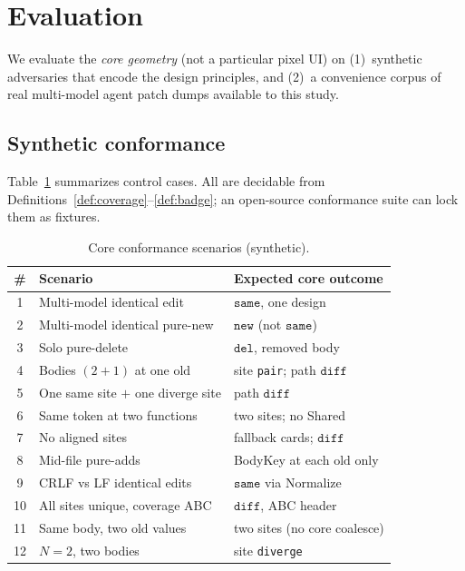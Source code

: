 \documentclass[
  11pt,
  a4paper,
  oneside,
  numbers=noenddot,
  abstract=true,
  headings=normal,
  DIV=11,
  BCOR=0mm,
]{scrartcl}
\theoremstyle{definition}
\theoremstyle{plain}
\theoremstyle{remark}
\newcommand{\badge}[1]{\texttt{#1}}
\begin{document}
\section{Evaluation}
\label{sec:eval}

We evaluate the \emph{core geometry} (not a particular pixel UI) on
(1)~synthetic adversaries that encode the design principles, and
(2)~a convenience corpus of real multi-model agent patch dumps available
to this study.

\subsection{Synthetic conformance}

Table~\ref{tab:conform} summarizes control cases. All are decidable from
Definitions~\ref{def:coverage}--\ref{def:badge}; an open-source conformance
suite can lock them as fixtures.

\begin{table}[t]
\centering
\caption{Core conformance scenarios (synthetic).}
\label{tab:conform}
\begin{tabular}{@{}clp{6.2cm}@{}}
\toprule
\# & Scenario & Expected core outcome \\
\midrule
1 & Multi-model identical edit & $\badge{same}$, one design \\
2 & Multi-model identical pure-new & $\badge{new}$ (not $\badge{same}$) \\
3 & Solo pure-delete & $\badge{del}$, removed body \\
4 & Bodies $(2{+}1)$ at one $\mathrm{old}$ & site \texttt{pair}; path $\badge{diff}$ \\
5 & One same site $+$ one diverge site & path $\badge{diff}$ \\
6 & Same token at two functions & two sites; no Shared \\
7 & No aligned sites & fallback cards; $\badge{diff}$ \\
8 & Mid-file pure-adds & BodyKey at each $\mathrm{old}$ only \\
9 & CRLF vs LF identical edits & $\badge{same}$ via Normalize \\
10 & All sites unique, coverage ABC & $\badge{diff}$, ABC header \\
11 & Same body, two $\mathrm{old}$ values & two sites (no core coalesce) \\
12 & $N{=}2$, two bodies & site \texttt{diverge} \\
\bottomrule
\end{tabular}
\end{table}
\end{document}
